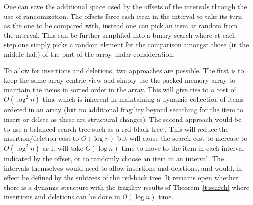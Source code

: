 One can save the additional space used by the offsets of the intervals through the use of randomization. The offsets force each item in the interval to take its turn as the one to be compared with, instead one can pick an item at random from the interval. This can be further simplified into a binary search where at each step one simply picks a random element for the comparison amongst those (in the middle half) of the part of the array under consideration. 

To allow for insertions and deletions, two approaches are possible. The first is to keep the same array-centric view and simply use the packed-memory array \cite{DBLP:conf/icalp/ItaiKR81,DBLP:conf/sigmod/Willard86,DBLP:journals/iandc/Willard92} to maintain the items in sorted order in the array. This will give rise to a cost of $O(\log^2 n)$ time which is inherent in maintaining a dynamic collection of items ordered in an array \cite{DBLP:journals/siamcomp/BulanekKS15} (but no additional fragility beyond searching for the item to insert or delete as these are structural changes).
The second approach would be to use a balanced search tree such as a red-black tree \cite{DBLP:conf/focs/GuibasS78}. This will reduce the insertion/deletion cost to $O(\log n)$ but will cause the search cost to increase to $O(\log^2 n)$ as it will take $O(\log n)$ time to move to the item in each interval indicated by the offset, or to randomly choose an item in an interval. The intervals themselves would need to allow insertions and deletions, and would, in effect be defined by the subtrees of the red-back tree.
It remains open whether there is a dynamic structure with the fragility results of Theorem~\ref{t:search} where insertions and deletions can be done in $O(\log n)$ time.



